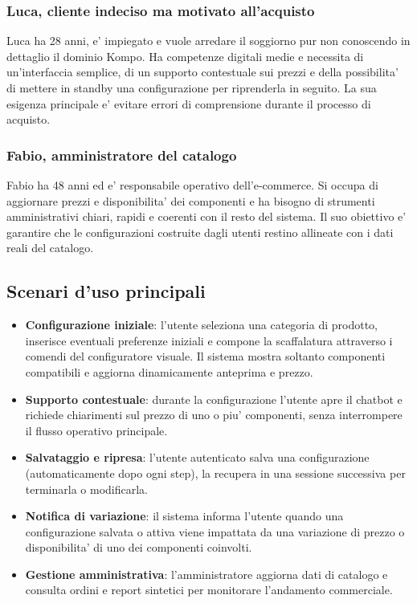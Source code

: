 \subsubsection{Luca, cliente indeciso ma motivato all'acquisto}

Luca ha 28 anni, e' impiegato e vuole arredare il soggiorno pur non conoscendo in dettaglio il dominio Kompo.
Ha competenze digitali medie e necessita di un'interfaccia semplice, di un supporto contestuale sui prezzi e della possibilita' di mettere in standby una configurazione per riprenderla in seguito. 
La sua esigenza principale e' evitare errori di comprensione durante il processo di acquisto.

\subsubsection{Fabio, amministratore del catalogo}

Fabio ha 48 anni ed e' responsabile operativo dell'e-commerce. 
Si occupa di aggiornare prezzi e disponibilita' dei componenti e ha bisogno di strumenti amministrativi chiari, rapidi e coerenti con il resto del sistema. 
Il suo obiettivo e' garantire che le configurazioni costruite dagli utenti restino allineate con i dati reali del catalogo.

\subsection{Scenari d'uso principali}

\begin{itemize}
	\item \textbf{Configurazione iniziale}: l'utente seleziona una categoria di prodotto, inserisce eventuali preferenze iniziali e compone la scaffalatura attraverso i comendi del configuratore visuale. Il sistema mostra soltanto componenti compatibili e aggiorna dinamicamente anteprima e prezzo.
	\item \textbf{Supporto contestuale}: durante la configurazione l'utente apre il chatbot e richiede chiarimenti sul prezzo di uno o piu' componenti, senza interrompere il flusso operativo principale.
	\item \textbf{Salvataggio e ripresa}: l'utente autenticato salva una configurazione (automaticamente dopo ogni step), la recupera in una sessione successiva per terminarla o modificarla.
	\item \textbf{Notifica di variazione}: il sistema informa l'utente quando una configurazione salvata o attiva viene impattata da una variazione di prezzo o disponibilita' di uno dei componenti coinvolti.
	\item \textbf{Gestione amministrativa}: l'amministratore aggiorna dati di catalogo e consulta ordini e report sintetici per monitorare l'andamento commerciale.
\end{itemize}

